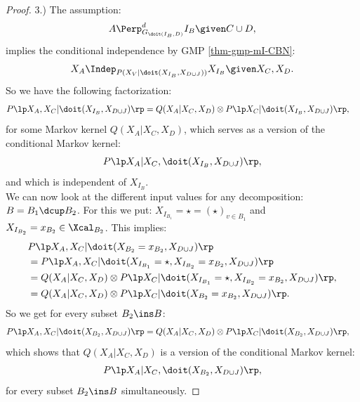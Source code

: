 \begin{Cor}[Do-calculus]
\begin{proof}
3.) The assumption:
            \[ A \Perp^d_{G_{\doit(I_B,D)}} I_B \given C  \cup D,   \]
implies the conditional independence by GMP \ref{thm-gmp-mI-CBN}:
\[ X_A \Indep_{P(X_V|\doit(X_{I_B},X_{D\cup J}))} X_{I_B} \given X_C,X_D.\]
So we have the following factorization:
\begin{align} 
    P\lp X_A,X_C|\doit(X_{I_B},X_{D\cup J})\rp &= Q(X_A|X_C,X_D) \otimes P\lp X_C|\doit(X_{I_B},X_{D\cup J})\rp,
\label{eq:3nd-do-int-1} 
\end{align}
for some Markov kernel $Q(X_A|X_C,X_D)$, which serves as a version of the conditional Markov kernel:
\[P\lp X_A|X_C,\doit(X_{I_B},X_{D\cup J})\rp,\]
and which is independent of $X_{I_B}$.\\ 
We can now look at the different input values for any decomposition: $B=B_1 \dcup B_2$.
For this we put: $X_{I_{B_1}}= \star = (\star)_{v \in B_1}$ and  $ X_{I_{B_2}}=x_{B_2} \in \Xcal_{B_2}$.
This implies:
\begin{align*} 
  & P\lp X_A,X_C|\doit(X_{{B_2}}=x_{B_2},X_{D\cup J})\rp \\
  &= P\lp X_A,X_C|\doit(X_{I_{B_1}}=\star,X_{I_{B_2}}=x_{B_2},X_{D\cup J})\rp \\
  &= Q(X_A|X_C,X_D) \otimes P\lp X_C|\doit(X_{I_{B_1}}=\star,X_{I_{B_2}}=x_{B_2},X_{D\cup J})\rp,\\
  &= Q(X_A|X_C,X_D) \otimes P\lp X_C|\doit(X_{{B_2}}=x_{B_2},X_{D\cup J})\rp.
\end{align*}
So we get for every subset $B_2 \ins B$:
\begin{align} 
    P\lp X_A,X_C|\doit(X_{B_2},X_{D\cup J})\rp &= Q(X_A|X_C,X_D) \otimes P\lp X_C|\doit(X_{B_2},X_{D\cup J})\rp, \label{eq:3nd-do-int-2} 
\end{align}
which shows that $Q(X_A|X_C,X_D)$ is a version of the conditional Markov kernel:
\begin{align} P\lp X_A|X_C,\doit(X_{B_2},X_{D\cup J})\rp, \label{eq:3nd-do-int-3}  \end{align}
for every subset $B_2 \ins B$ simultaneously.


\end{proof}
\end{Cor}
